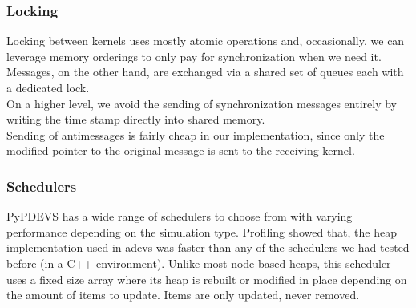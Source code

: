 \subsubsection{Locking}
Locking between kernels uses mostly atomic operations and, occasionally, we can leverage memory orderings to only pay for synchronization when we need it. Messages, on the other hand, are exchanged via a shared set of queues each with a dedicated lock.\\
On a higher level, we avoid the sending of synchronization messages entirely by writing the time stamp directly into shared memory.\\ Sending of antimessages is fairly cheap in our implementation, since only the modified pointer to the original message is sent to the receiving kernel.
\subsubsection{Schedulers}
PyPDEVS has a wide range of schedulers to choose from with varying performance depending on the simulation type. Profiling showed that, the heap implementation used in adevs was faster than any of the schedulers we had tested before (in a C++ environment). Unlike most node based heaps, this scheduler uses a fixed size array where its heap is rebuilt or modified in place depending on the amount of items to update. Items are only updated, never removed.
